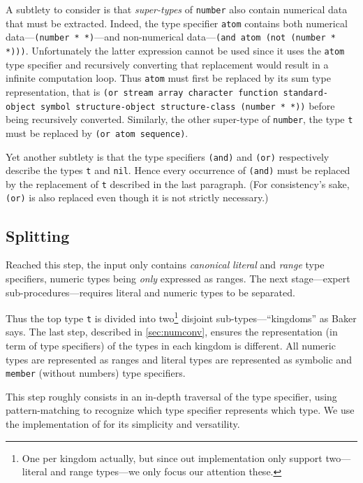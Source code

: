 \documentclass[format=sigconf]{acmart}
\newcommand\code[2][\small]{\sloppy\texttt{#1#2}}
\theoremstyle{definition}
\begin{document}
A subtlety to consider is that \textit{super-types} of \code{number} also
contain numerical data that must be extracted. Indeed, the type specifier
\code{atom} contains both numerical data---\code{(number * *)}---and non-numerical
data---\code{(and atom (not (number * *)))}. Unfortunately the latter
expression cannot be used since it uses the \code{atom} type specifier and
recursively converting that replacement would result in a infinite computation
loop. Thus \code{atom} must first be replaced by its sum type representation,
that is \code{(or stream array character function standard-object symbol
  structure-object structure-class (number * *))} before being recursively
converted. Similarly, the other super-type of \code{number}, the type \code{t}
must be replaced by \code{(or atom sequence)}.

Yet another subtlety is that the type specifiers \code{(and)} and
\code{(or)} respectively describe the types \code{t} and \code{nil}. Hence
every occurrence of \code{(and)} must be replaced by the replacement of
\code{t} described in the last paragraph. (For consistency's sake, \code{(or)}
is also replaced even though it is not strictly necessary.)

\subsection{Splitting}
Reached this step, the input only contains \emph{canonical} \emph{literal} and
\emph{range} type specifiers, numeric types being \emph{only} expressed as
ranges. The next stage---expert sub-procedures---requires literal and numeric
types to be separated.

Thus the top type \code{t} is divided into two\footnote{
  One per kingdom actually, but since out implementation only support
  two---literal and range types---we only focus our attention these.
} disjoint sub-types---``kingdoms'' as Baker says. The last step, described in
\vref{sec:numconv}, ensures the representation (in term of type specifiers) of
the types in each kingdom is different. All numeric types are represented as
ranges and literal types are represented as symbolic and \code{member} (without
numbers) type specifiers.

This step roughly consists in an in-depth traversal of the type specifier, using
pattern-matching to recognize which type specifier represents which type. We use
the implementation of \cite{paip} for its simplicity and versatility.
\end{document}
